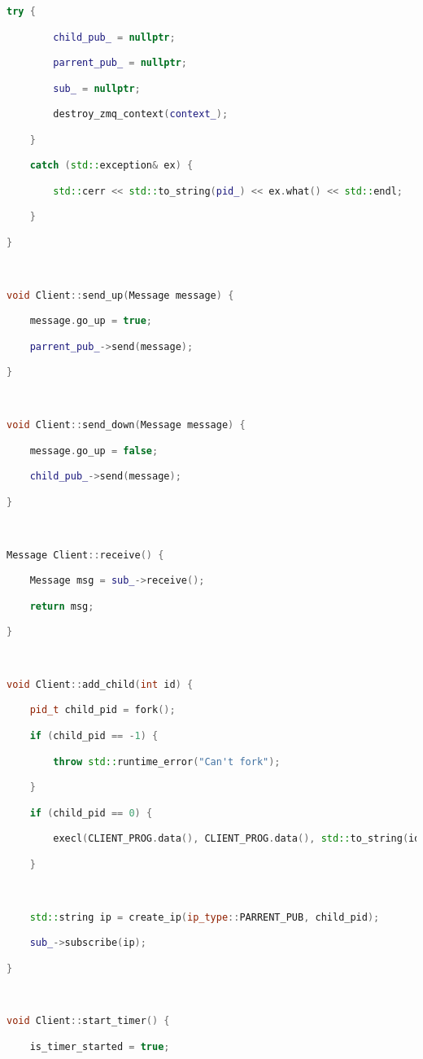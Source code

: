 \begin{lstlisting}[language=C++]
    try {

        child_pub_ = nullptr;

        parrent_pub_ = nullptr;

        sub_ = nullptr;

        destroy_zmq_context(context_);

    } 

    catch (std::exception& ex) {

        std::cerr << std::to_string(pid_) << ex.what() << std::endl;

    }

}



void Client::send_up(Message message) {

    message.go_up = true;

    parrent_pub_->send(message);

}



void Client::send_down(Message message) {

    message.go_up = false;

    child_pub_->send(message);

}



Message Client::receive() {

    Message msg = sub_->receive();

    return msg;

}



void Client::add_child(int id) {

    pid_t child_pid = fork();

    if (child_pid == -1) {

        throw std::runtime_error("Can't fork");

    }

    if (child_pid == 0) {

        execl(CLIENT_PROG.data(), CLIENT_PROG.data(), std::to_string(id).data(), child_pub_->ip().data(), NULL);

    }



    std::string ip = create_ip(ip_type::PARRENT_PUB, child_pid);

    sub_->subscribe(ip);

}



void Client::start_timer() {

    is_timer_started = true;


\end{lstlisting}
